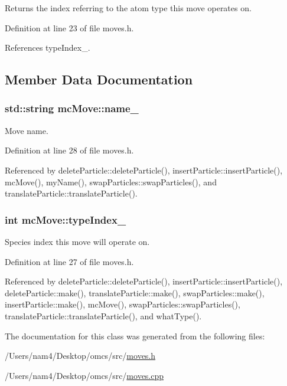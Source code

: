 Returns the index referring to the atom type this move operates on. 



Definition at line 23 of file moves.\+h.



References type\+Index\+\_\+.



\subsection{Member Data Documentation}
\hypertarget{classmc_move_ac18c307855e1cb5751bd6e079857a8c5}{}
\subsubsection[{name\+\_\+}]{\setlength{\rightskip}{0pt plus 5cm}std\+::string mc\+Move\+::name\+\_\+\hspace{0.3cm}{\ttfamily [protected]}}\label{classmc_move_ac18c307855e1cb5751bd6e079857a8c5}


Move name. 



Definition at line 28 of file moves.\+h.



Referenced by delete\+Particle\+::delete\+Particle(), insert\+Particle\+::insert\+Particle(), mc\+Move(), my\+Name(), swap\+Particles\+::swap\+Particles(), and translate\+Particle\+::translate\+Particle().

\hypertarget{classmc_move_acb731965547b0326ef318ec96da8b46a}{}
\subsubsection[{type\+Index\+\_\+}]{\setlength{\rightskip}{0pt plus 5cm}int mc\+Move\+::type\+Index\+\_\+\hspace{0.3cm}{\ttfamily [protected]}}\label{classmc_move_acb731965547b0326ef318ec96da8b46a}


Species index this move will operate on. 



Definition at line 27 of file moves.\+h.



Referenced by delete\+Particle\+::delete\+Particle(), insert\+Particle\+::insert\+Particle(), delete\+Particle\+::make(), translate\+Particle\+::make(), swap\+Particles\+::make(), insert\+Particle\+::make(), mc\+Move(), swap\+Particles\+::swap\+Particles(), translate\+Particle\+::translate\+Particle(), and what\+Type().



The documentation for this class was generated from the following files\+:\begin{DoxyCompactItemize}
\item 
/\+Users/nam4/\+Desktop/omcs/src/\hyperlink{moves_8h}{moves.\+h}\item 
/\+Users/nam4/\+Desktop/omcs/src/\hyperlink{moves_8cpp}{moves.\+cpp}\end{DoxyCompactItemize}
